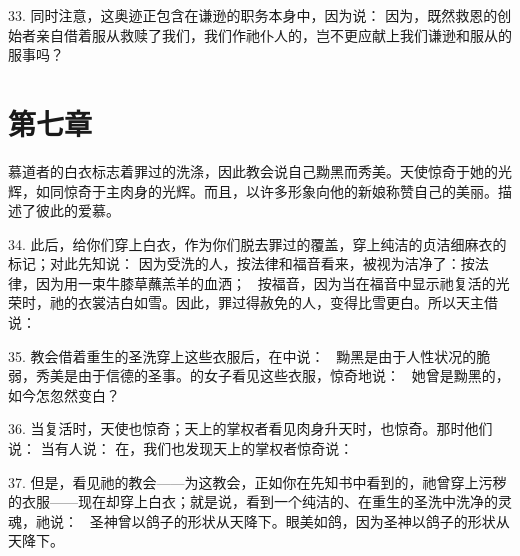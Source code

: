 33. 同时注意，这奥迹正包含在谦逊的职务本身中，因为说： 因为，既然救恩的创始者亲自借着服从救赎了我们，我们作祂仆人的，岂不更应献上我们谦逊和服从的服事吗？\par


\section{第七章}

慕道者的白衣标志着罪过的洗涤，因此教会说自己黝黑而秀美。天使惊奇于她的光辉，如同惊奇于主肉身的光辉。而且，以许多形象向他的新娘称赞自己的美丽。描述了彼此的爱慕。\par

34. 此后，给你们穿上白衣，作为你们脱去罪过的覆盖，穿上纯洁的贞洁细麻衣的标记；对此先知说： 因为受洗的人，按法律和福音看来，被视为洁净了：按法律，因为用一束牛膝草蘸羔羊的血洒；~ 按福音，因为当在福音中显示祂复活的光荣时，祂的衣裳洁白如雪。因此，罪过得赦免的人，变得比雪更白。所以天主借说：~\par

35. 教会借着重生的圣洗穿上这些衣服后，在中说：~ 黝黑是由于人性状况的脆弱，秀美是由于信德的圣事。的女子看见这些衣服，惊奇地说：~ 她曾是黝黑的，如今怎忽然变白？\par

36. 当复活时，天使也惊奇；天上的掌权者看见肉身升天时，也惊奇。那时他们说： 当有人说： 在，我们也发现天上的掌权者惊奇说：~\par

37. 但是，看见祂的教会——为这教会，正如你在先知书中看到的，祂曾穿上污秽的衣服——现在却穿上白衣；就是说，看到一个纯洁的、在重生的圣洗中洗净的灵魂，祂说：~ 圣神曾以鸽子的形状从天降下。眼美如鸽，因为圣神以鸽子的形状从天降下。\par

